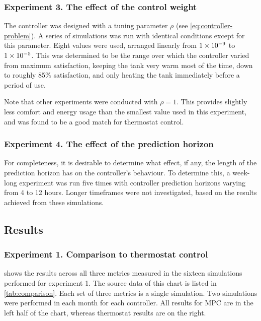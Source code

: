 \subsubsection{Experiment 3. The effect of the control weight}
\label{experiment3}

The controller was designed with a tuning parameter $\rho$ (see \autoref{eq:controller-problem}).
A series of simulations was run with identical conditions except for this parameter.
Eight values were used, arranged linearly from $1\times 10^{-9}$ to $1\times 10^{-5}$.
This was determined to be the range over which the controller varied from maximum satisfaction, keeping the tank very warm most of the time, down to roughly 85\% satisfaction, and only heating the tank immediately before a period of use.

Note that other experiments were conducted with $\rho = 1$.
This provides slightly less comfort and energy usage than the smallest value used in this experiment, and was found to be a good match for thermostat control.

\subsubsection{Experiment 4. The effect of the prediction horizon}

For completeness, it is desirable to determine what effect, if any, the length of the prediction horizon has on the controller's behaviour.
To determine this, a week-long experiment was run five times with controller prediction horizons varying from 4 to 12 hours.
Longer timeframes were not investigated, based on the results achieved from these simulations.

\subsection{Results}

\subsubsection{Experiment 1. Comparison to thermostat control}

 shows the results across all three metrics measured in the sixteen simulations performed for experiment 1.
The source data of this chart is listed in \autoref{tab:comparison}.
Each set of three metrics is a single simulation.
Two simulations were performed in each month for each controller.
All results for MPC are in the left half of the chart, whereas thermostat results are on the right.

